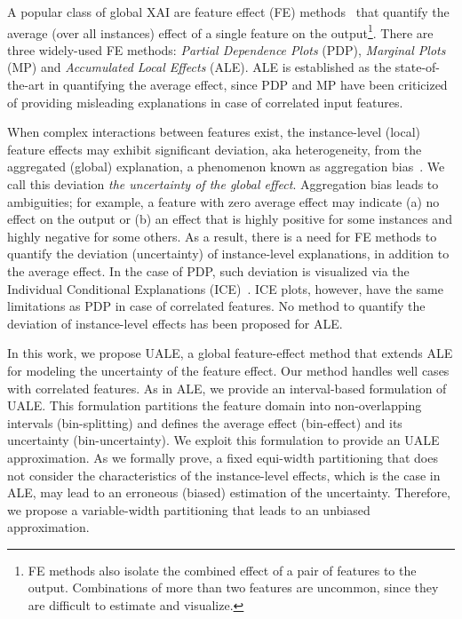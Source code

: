 \documentclass[twoside]{article}
\begin{document}
A popular class of global XAI are feature effect (FE)
methods~\citep{Gromping2020MAEP} that quantify the average (over all
instances) effect of a single feature on the output\footnote{FE
  methods also isolate the combined effect of a pair of features to
  the output. Combinations of more than two features are uncommon,
  since they are difficult to estimate and visualize.}. There are
three widely-used FE methods: \emph{Partial Dependence Plots}
(PDP)\citep{friedman2001greedy}, \emph{Marginal Plots}
(MP)\citep{apley2020visualizing} and \emph{Accumulated Local Effects}
(ALE)\citep{apley2020visualizing}. ALE is established as the
state-of-the-art in quantifying the average effect, since PDP and MP
have been criticized~\citep{Gromping2020MAEP} of providing misleading explanations in case of  correlated input features.

When complex interactions between features exist, the instance-level
(local) feature effects may exhibit significant deviation, aka heterogeneity, from the aggregated (global)
explanation, a phenomenon known as aggregation
  bias~\citep{mehrabi2021survey}. We call this deviation \emph{the uncertainty of the global effect}. Aggregation bias leads to
ambiguities; for example, a feature with zero average effect may
indicate (a) no effect on the output or (b) an effect that is highly
positive for some instances and highly negative for some others. As a
result, there is a need for FE methods to quantify the deviation (uncertainty) of
instance-level explanations, in addition to the average effect. In the
case of PDP, such deviation is visualized via the Individual
Conditional Explanations (ICE)~\citep{goldstein2015peeking}. ICE
plots, however, have the same limitations as PDP in case of correlated
features. No method to quantify the deviation of instance-level effects has been proposed for ALE.

In this work, we propose UALE, a global feature-effect method that
extends ALE for modeling the uncertainty of the feature effect.
Our method handles well cases with correlated features. 
As in ALE, we provide an interval-based formulation of UALE. 
This formulation partitions the feature domain into non-overlapping 
intervals (bin-splitting) and defines the average effect (bin-effect) and its uncertainty (bin-uncertainty). We exploit this formulation to provide an UALE approximation. 
As we formally prove, a fixed equi-width partitioning that does not consider
the characteristics of the instance-level effects, which is the case in ALE, 
may lead to an erroneous (biased) estimation of the uncertainty. 
Therefore, we propose a variable-width partitioning that leads to an unbiased approximation.
\end{document}
